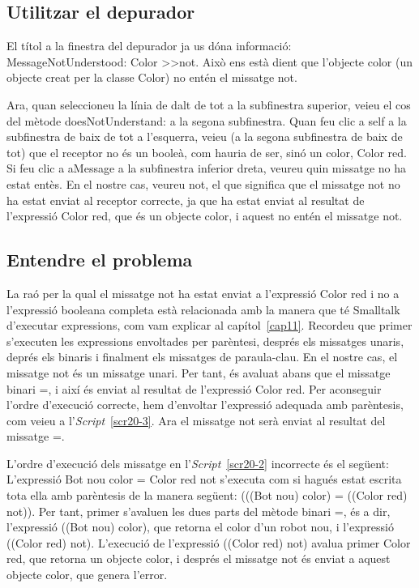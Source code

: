 \subsection{Utilitzar el depurador}
El títol a la finestra del depurador ja us dóna informació: \textsf{MessageNotUnderstood: Color \textgreater\textgreater not}. Això ens està dient que l'objecte color (un objecte creat per la classe \textsf{Color}) no entén el missatge \textsf{not}.

Ara, quan seleccioneu la línia de dalt de tot a la subfinestra superior, veieu el cos del mètode \textsf{doesNotUnderstand:} a la segona subfinestra. Quan feu clic a \textsf{self} a la subfinestra de baix de tot a l'esquerra, veieu (a la segona subfinestra de baix de tot) que el receptor no és un booleà, com hauria de ser, sinó un color, \textsf{Color red}. Si feu clic a \textsf{aMessage} a la subfinestra inferior dreta, veureu quin missatge no ha estat entès. En el nostre cas, veureu \textsf{not}, el que significa que el missatge \textsf{not} no ha estat enviat al receptor correcte, ja que ha estat enviat al resultat de l'expressió \textsf{Color red}, que és un objecte color, i aquest no entén el missatge \textsf{not}.

\subsection{Entendre el problema}
La raó per la qual el missatge \textsf{not} ha estat enviat a l'expressió \textsf{Color red} i no a l'expressió booleana completa està relacionada amb la manera que té Smalltalk d'executar expressions, com vam explicar al capítol~\ref{cap11}. Recordeu que primer s'executen les expressions envoltades per parèntesi, després els missatges unaris, deprés els binaris i finalment els missatges de paraula-clau. En el nostre cas, el missatge \textsf{not} és un missatge unari. Per tant, és avaluat abans que el missatge binari \textsf{=}, i així és enviat al resultat de l'expressió \textsf{Color red}. Per aconseguir l'ordre d'execució correcte, hem d'envoltar l'expressió adequada amb parèntesis, com veieu a l'\emph{Script}~\ref{scr20-3}. Ara el missatge \textsf{not} serà enviat al resultat del missatge \textsf{=}.

L'ordre d'execució dels missatge en l'\emph{Script}~\ref{scr20-2} incorrecte és el següent: L'expressió \textsf{Bot nou color = Color red not} s'executa com si hagués estat escrita tota ella amb parèntesis de la manera següent: \textsf{(((Bot nou) color) = ((Color red) not))}. Per tant, primer s'avaluen les dues parts del mètode binari \textsf{=}, és a dir, l'expressió \textsf{((Bot nou) color)}, que retorna el color d'un robot nou, i l'expressió \textsf{((Color red) not)}. L'execució de l'expressió \textsf{((Color red) not)} avalua primer \textsf{Color red}, que retorna un objecte color, i després el missatge \textsf{not} és enviat  a aquest objecte color, que genera l'error.

